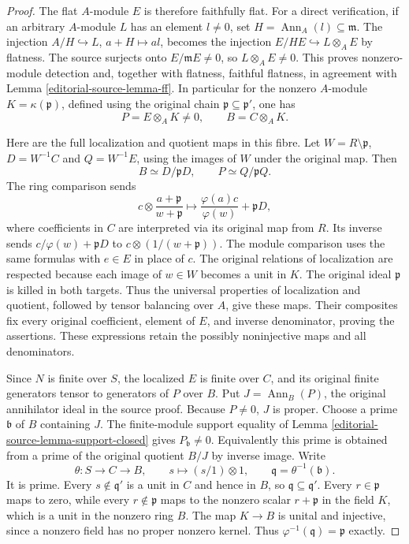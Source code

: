 \begin{proof}
The flat $A$-module $E$ is therefore faithfully
flat. For a direct verification, if an arbitrary
$A$-module $L$ has an element $l\ne0$, set
$H=\operatorname{Ann}_A(l)\subseteq\mathfrak m$.
The injection $A/H\hookrightarrow L$,
$a+H\mapsto al$, becomes the injection
$E/HE\hookrightarrow L\otimes_AE$ by flatness.
The source surjects onto $E/\mathfrak mE\ne0$,
so $L\otimes_AE\ne0$. This proves nonzero-module
detection and, together with flatness, faithful
flatness, in agreement with Lemma \ref{editorial-source-lemma-ff}.
In particular for the nonzero $A$-module
$K=\kappa(\mathfrak p)$, defined using the original
chain $\mathfrak p\subseteq\mathfrak p'$, one has
$$
P=E\otimes_AK\ne0,
\qquad B=C\otimes_AK.
$$

Here are the full localization and quotient maps
in this fibre. Let $W=R\setminus\mathfrak p$,
$D=W^{-1}C$ and $Q=W^{-1}E$, using the images of
$W$ under the original map. Then
$$
B\simeq D/\mathfrak pD,\qquad
P\simeq Q/\mathfrak pQ.
$$
The ring comparison sends
$$
c\otimes\frac{a+\mathfrak p}{w+\mathfrak p}
\longmapsto\frac{\varphi(a)c}{\varphi(w)}+\mathfrak pD,
$$
where coefficients in $C$ are interpreted via its
original map from $R$. Its inverse sends
$c/\varphi(w)+\mathfrak pD$ to
$c\otimes(1/(w+\mathfrak p))$.
The module comparison uses the same formulas
with $e\in E$ in place of $c$. The original
relations of localization are respected because
each image of $w\in W$ becomes a unit in $K$.
The original ideal $\mathfrak p$ is killed in
both targets. Thus the universal properties of
localization and quotient, followed by tensor
balancing over $A$, give these maps. Their
composites fix every original coefficient,
element of $E$, and inverse denominator, proving
the assertions. These expressions retain the
possibly noninjective maps and all denominators.

Since $N$ is finite over $S$, the localized
$E$ is finite over $C$, and its original finite
generators tensor to generators of $P$ over $B$.
Put $J=\operatorname{Ann}_B(P)$, the original
annihilator ideal in the source proof.
Because $P\ne0$, $J$ is proper. Choose a prime
$\mathfrak b$ of $B$ containing $J$.
The finite-module support equality of
Lemma \ref{editorial-source-lemma-support-closed} gives
$P_{\mathfrak b}\ne0$.
Equivalently this prime is obtained from a prime
of the original quotient $B/J$ by inverse image.
Write
$$
\theta:S\longrightarrow C\longrightarrow B,
\qquad s\longmapsto (s/1)\otimes1,
\qquad \mathfrak q=\theta^{-1}(\mathfrak b).
$$
It is prime. Every $s\notin\mathfrak q'$ is a
unit in $C$ and hence in $B$, so
$\mathfrak q\subseteq\mathfrak q'$.
Every $r\in\mathfrak p$ maps to zero, while
every $r\notin\mathfrak p$ maps to the nonzero
scalar $r+\mathfrak p$ in the field $K$, which
is a unit in the nonzero ring $B$. The map
$K\to B$ is unital and injective, since a
nonzero field has no proper nonzero kernel.
Thus
$\varphi^{-1}(\mathfrak q)=\mathfrak p$ exactly.


\end{proof}
